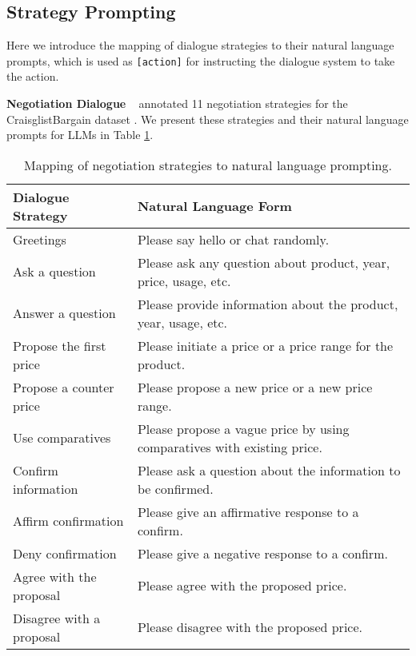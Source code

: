 \documentclass{article} %
\begin{document}
\clearpage
\subsection{Strategy Prompting}\label{app:strategy}
Here we introduce the mapping of dialogue strategies to their natural language prompts, which is used as \texttt{[action]} for instructing the dialogue system to take the action.

\noindent \textbf{Negotiation Dialogue} ~ \citet{acl21-negotiate-tom} annotated 11 negotiation strategies for the CraisglistBargain dataset \citep{emnlp18-negotiate}. We present these strategies and their natural language prompts for LLMs in Table \ref{tab:negotiate_strat}. 


\begin{table}[h]
    \centering
    \begin{tabular}{l|p{9.5cm}}
        Dialogue Strategy & Natural Language Form \\
        \hline
        Greetings & Please say hello or chat randomly.\\
        Ask a question & Please ask any question about product, year, price, usage, etc.\\
        Answer a question & Please provide information about the product, year, usage, etc.\\
        Propose the first price & Please initiate a price or a price range for the product.\\
        Propose a counter price & Please propose a new price or a new price range.\\
        Use comparatives & Please propose a vague price by using comparatives with existing price. \\
        Confirm information & Please ask a question about the information to be confirmed.\\
        Affirm confirmation & Please give an affirmative response to a confirm.\\
        Deny confirmation & Please give a negative response to a confirm.\\
        Agree with the proposal & Please agree with the proposed price.\\
        Disagree with a proposal & Please disagree with the proposed price.\\
    \end{tabular}
    \caption{Mapping of negotiation strategies to natural language prompting.}
    \label{tab:negotiate_strat}
\end{table}
\end{document}
